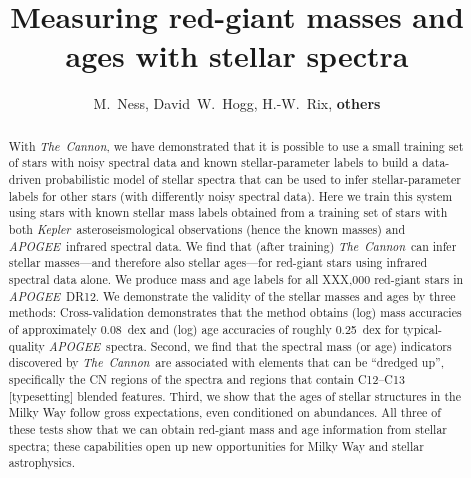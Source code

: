 \documentclass[12pt, preprint]{aastex}
\newcommand{\project}[1]{\textsl{#1}}
\newcommand{\thecannon}{\project{The~Cannon}}
\newcommand{\apogee}{\project{APOGEE}}
\newcommand{\kepler}{\project{Kepler}}
\begin{document}
\title{Measuring red-giant masses and ages with stellar spectra}
\author{M.~Ness,
David~W.~Hogg,
H.-W.~Rix,
\textbf{others}}

\begin{abstract}%
With \thecannon, we have demonstrated that it is possible to use a
small training set of stars with noisy spectral data and known
stellar-parameter labels to build a data-driven probabilistic model of
stellar spectra that can be used to infer stellar-parameter labels for
other stars (with differently noisy spectral data).
Here we train this system using stars with known stellar mass labels
obtained from a training set of stars with both
\kepler\ asteroseismological observations (hence the known masses) and
\apogee\ infrared spectral data.
We find that (after training) \thecannon\ can infer stellar
masses---and therefore also stellar ages---for red-giant stars using
infrared spectral data alone.
We produce mass and age labels for all XXX,000 red-giant stars in \apogee\ DR12.
We demonstrate the validity of the stellar masses and ages by three
methods:
Cross-validation demonstrates that the method obtains (log) mass accuracies of approximately 0.08~dex and (log) age accuracies
of roughly 0.25~dex for typical-quality \apogee\ spectra.
Second, we find that the spectral mass (or age) indicators
discovered by \thecannon\ are associated with elements that can be ``dredged up'',
specifically the CN regions of the spectra and regions that contain C12--C13 [typesetting] blended features. 
Third, we show that the ages of stellar structures in the
Milky Way follow gross expectations, even conditioned on abundances.
All three of these tests show that we can obtain red-giant mass and
age information from stellar spectra; these capabilities open up new
opportunities for Milky Way and stellar astrophysics.
\end{abstract}
\end{document}
